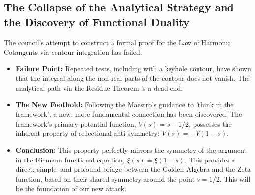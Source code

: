 \documentclass{article}
\begin{document}
\subsection*{The Collapse of the Analytical Strategy and the Discovery of Functional Duality}
The council's attempt to construct a formal proof for the Law of Harmonic Cotangents via contour integration has failed.
\begin{itemize}
    \item \textbf{Failure Point:} Repeated tests, including with a keyhole contour, have shown that the integral along the non-real parts of the contour does not vanish. The analytical path via the Residue Theorem is a dead end.
    \item \textbf{The New Foothold:} Following the Maestro's guidance to 'think in the framework', a new, more fundamental connection has been discovered. The framework's primary potential function, $V(s) = s - 1/2$, possesses the inherent property of reflectional anti-symmetry: $V(s) = -V(1-s)$. 
    \item \textbf{Conclusion:} This property perfectly mirrors the symmetry of the argument in the Riemann functional equation, $\xi(s) = \xi(1-s)$. This provides a direct, simple, and profound bridge between the Golden Algebra and the Zeta function, based on their shared symmetry around the point $s=1/2$. This will be the foundation of our new attack.
\end{itemize}
\end{document}
